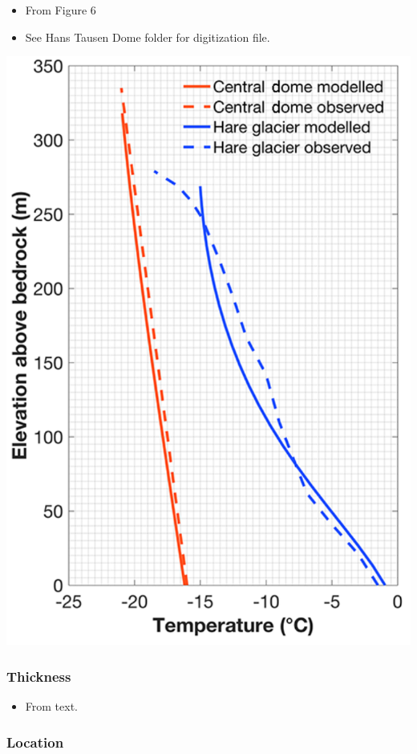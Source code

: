 \documentclass[article,a4paper,times,11pt,twoside]{article}
\begin{document}
\begin{itemize}
\item From \textcite{zekollari_2017} Figure 6
\item See Hans Tausen Dome folder for digitization file.
\end{itemize}
\begin{center}
\includegraphics[width=.9\linewidth]{hanstausen_hare/zekollari_2017_fig6.png}
\end{center}

\subsubsection{Thickness}
\label{sec:org0908a91}

\begin{itemize}
\item From \textcite{zekollari_2017} text.
\end{itemize}

\subsubsection{Location}
\label{sec:orge95f502}
\end{document}

